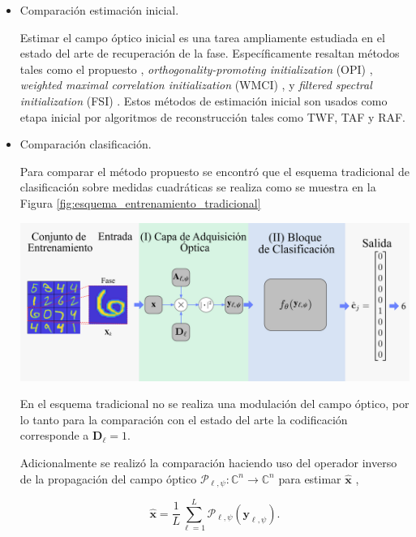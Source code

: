 \begin{itemize}
    \item Comparación estimación inicial.
    
    Estimar el campo óptico inicial es una tarea ampliamente estudiada en el estado del arte de recuperación de la fase. Específicamente resaltan métodos tales como el propuesto , \textit{orthogonality-promoting initialization} (OPI) , \textit{weighted maximal correlation initialization} (WMCI) , y \textit{filtered spectral initialization} (FSI) . Estos métodos de estimación inicial son usados como etapa inicial por algoritmos de reconstrucción tales como TWF, TAF y RAF.
    
    
    \item Comparación clasificación.
    
    Para comparar el método propuesto se encontró que el esquema tradicional de clasificación sobre medidas cuadráticas se realiza como se muestra en la Figura \ref{fig:esquema_entrenamiento_tradicional}
    
    \begin{minipage}[!h]{\linewidth}
      
      \includegraphics[width=\linewidth]{images/esquema_entrenamiento_tradicional.pdf}
        \label{fig:esquema_entrenamiento_tradicional}
    \end{minipage}
    
    En el esquema tradicional no se realiza una modulación del campo óptico, por lo tanto para la comparación con el estado del arte la codificación corresponde a $\mathbf{D}_\ell = 1$.
    
    Adicionalmente se realizó la comparación haciendo uso del operador inverso de la propagación del campo óptico $\mathcal{P}_{\ell, \psi}:\mathbb{C}^n\rightarrow \mathbb{C}^n$ para estimar $\hat{\mathbf{x}}$ ,
    
    \begin{equation}
        \hat{\mathbf{x}}= \frac{1}{L}\sum_{\ell=1}^{ L} \mathcal{P}_{\ell, \psi}(\mathbf{y}_{\ell, \psi}).
        \label{eq:back_propagation}
    \end{equation}
\end{itemize}

